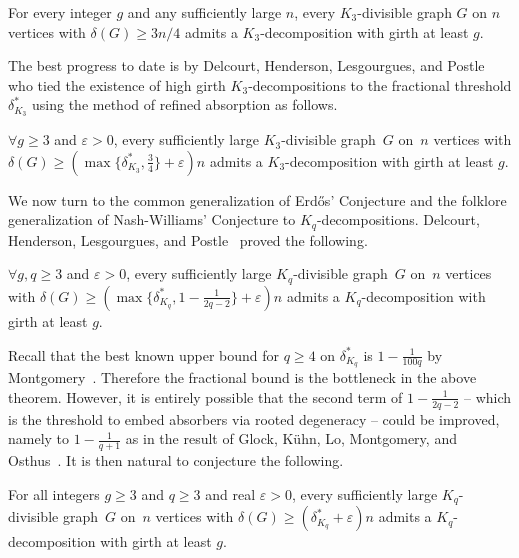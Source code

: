 \documentclass[twoside,leqno]{article}
\begin{document}
\begin{conj}\label{conj:E-NW}
    For every integer $g$ and any sufficiently large $n$, every $K_3$-divisible graph $G$ on $n$ vertices with $\delta(G)\geq 3n/4$ admits a $K_3$-decomposition with girth at least $g$.
\end{conj}

The best progress to date is by Delcourt, Henderson, Lesgourgues, and Postle~\cite{DHLP25} who tied the existence of high girth $K_3$-decompositions to the fractional threshold $\delta^*_{K_3}$ using the method of refined absorption as follows.

\begin{thm}\label{thm:ENW} $\forall g\geq 3$ and $\varepsilon>0$, every sufficiently large $K_3$-divisible graph~$G$ on~$n$ vertices with 
    $\delta(G)\ge (\max\{\delta^*_{K_3},\frac{3}{4}\}+\varepsilon)n$
    admits a $K_3$-decomposition with girth at least $g$. 
\end{thm}

We now turn to the common generalization of Erd\H{o}s' Conjecture and the folklore generalization of Nash-Williams' Conjecture to $K_q$-decompositions. Delcourt, Henderson, Lesgourgues, and Postle~\cite{DHLP25} proved the following.

\begin{thm}\label{thm:GenralisationMain2q} $\forall g,q\geq 3$ and $\varepsilon>0$, every sufficiently large $K_q$-divisible graph~$G$ on~$n$ vertices with $\delta(G)\ge (\max\{\delta^*_{K_q},1-\frac{1}{2q-2}\}+\varepsilon)n$
    admits a $K_q$-decomposition with girth at least $g$. 
\end{thm}

Recall that the best known upper bound for $q \geq 4$ on $\delta^*_{K_q}$ is $1-\frac{1}{100q}$ by Montgomery~\cite{montgomery_fractional_2019}. Therefore the fractional bound is the bottleneck in the above theorem. However, it is entirely possible that the second term of $1-\frac{1}{2q-2}$ -- which is the threshold to embed absorbers via rooted degeneracy -- could be improved, namely to $1-\frac{1}{q+1}$ as in the result of Glock, K\"uhn, Lo, Montgomery, and Osthus~\cite{GKLMO19}. It is then natural to conjecture the following.
\begin{conj}\label{conj:ENWLargeCliquesNoEpsilon}
    For all integers $g\geq 3$ and $q\geq 3$ and real $\varepsilon > 0$, every sufficiently large $K_q$-divisible graph~$G$ on~$n$ vertices with $\delta(G)\ge (\delta^*_{K_q}+\varepsilon)n$ admits a $K_q$-decomposition with girth at least $g$.
\end{conj}
\end{document}
